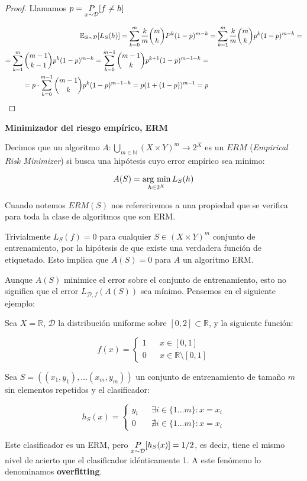 \begin{proof}
  Llamamos $p= \underset{x\sim \mathcal{D}}{P} [f\neq h]$

  \begin{align*}
  \mathbb{E}_{S\sim \mathcal{D}} [L_S(h)] = \sum_{k=0}^m \frac{k}{m} \binom{m}{k} P^k(1-p)^{m-k} & = \sum_{k=1}^m \frac{k}{m} \binom{m}{k} p^k(1-p)^{m-k} =\\
  = \sum_{k=1}^m \binom{m-1}{k-1} p^k(1-p)^{m-k} = \sum_{k=0}^{m-1} \binom{m-1}{k} p^{k+1}(1-p)^{m-1-k} = \\
  = p\cdot \sum_{k=0}^{m-1} \binom{m-1}{k} p^{k}(1-p)^{m-1-k} = p(1+(1-p))^{m-1} = p
  \end{align*}
\end{proof}


\begin{definition} \textbf{Minimizador del riesgo empírico, ERM}

Decimos que un algoritmo $A: \underset{m\in \mathbb{N}}{\bigcup} (X\times Y)^m \rightarrow 2^{X}$ es un $ERM$ 
(\emph{Empirical Risk Minimizer}) si busca una hipótesis cuyo error empírico sea mínimo:

\[A(S) = \operatorname*{arg\,\min}_{h\in 2^X} L_S(h)\]
\end{definition}

Cuando notemos $ERM(S)$ nos refereriremos a una propiedad que se verifica para toda la clase de algoritmos que son ERM.

Trivialmente $L_S(f) = 0$ para cualquier $S \in (X \times Y)^m$ conjunto de entrenamiento, por la hipótesis de que existe una
verdadera función de etiquetado. Esto implica que $A(S) = 0$ para $A$ un algoritmo ERM.

Aunque $A(S)$ minimice el error sobre el conjunto de entrenamiento, esto no significa que el error $L_{\mathcal{D},f} (A(S))$ 
sea mínimo. Pensemos en el siguiente ejemplo:

\begin{example}
Sea $X = \mathbb{R}$, $\mathcal{D}$ la distribución uniforme sobre $[0,2]\subset \mathbb{R}$, y la siguiente función:

\[f(x) = \left\{\begin{array}{lcl}
1 && x\in [0,1]\\
0 && x\in \mathbb{R}\setminus [0,1]
\end{array}\right.\]


Sea $S = ((x_1,y_1), \ldots (x_m, y_m))$ un conjunto de entrenamiento de tamaño $m$ sin elementos repetidos y el clasificador:

\[h_S(x) = \left\{\begin{array}{lcl}
y_i && \exists i\in \{1\ldots m\} : x=x_i\\
0 && \nexists i\in \{1\ldots m\} : x=x_i
\end{array}\right.\]

Este clasificador es un ERM, pero $\underset{x\sim \mathcal{D}}{P}[h_S(x)] = 1/2$, es decir, tiene el mismo nivel de acierto que el 
clasificador idénticamente 1. A este fenómeno lo denominamos \textbf{overfitting}.
\end{example}

